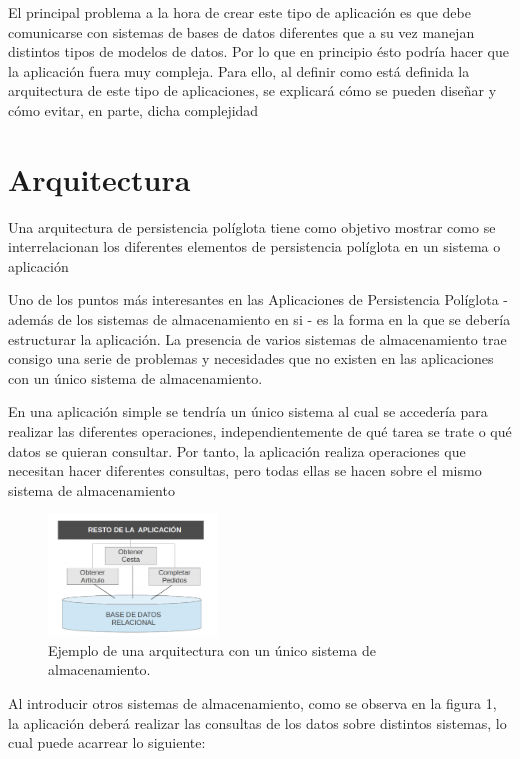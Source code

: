 \documentclass[conference]{IEEEtran}
\begin{document}
El principal problema a la hora de crear este tipo de aplicación es que debe comunicarse con sistemas de bases de datos diferentes que a su vez manejan distintos tipos de modelos de datos. Por lo que en principio \'esto podr\'ia hacer que la aplicaci\'on fuera muy compleja. Para ello, al definir como est\'a definida la arquitectura de este tipo de aplicaciones, se explicar\'a c\'omo se pueden diseñar y c\'omo evitar, en parte, dicha complejidad


\section{Arquitectura}
Una arquitectura de persistencia políglota tiene como objetivo mostrar como se interrelacionan los diferentes elementos de persistencia políglota en un sistema o aplicación

Uno de los puntos más interesantes en las Aplicaciones de Persistencia Políglota - adem\'as
de los sistemas de almacenamiento en si - es la forma en la que se debería estructurar
la aplicaci\'on. La presencia de varios sistemas de almacenamiento trae consigo una serie
de problemas y necesidades que no existen en las aplicaciones con un \'unico sistema de
almacenamiento.

En una aplicaci\'on simple se tendr\'ia un \'unico sistema al cual se acceder\'ia para realizar las diferentes operaciones, independientemente de qu\'e tarea se trate o qu\'e datos se quieran consultar. Por tanto, la aplicaci\'on realiza operaciones que necesitan hacer diferentes consultas, pero todas ellas se hacen sobre el mismo sistema de almacenamiento

\begin{figure}[!h]
\centering
\includegraphics[width=0.4\textwidth]{1}
\caption{Ejemplo de una arquitectura con un \'unico sistema de almacenamiento.}
\label{fig1}
\end{figure}
Al introducir otros sistemas de almacenamiento, como se observa en la figura 1, la aplicaci\'on deber\'a realizar las consultas de los datos sobre distintos sistemas, lo cual puede acarrear lo siguiente:
\end{document}
